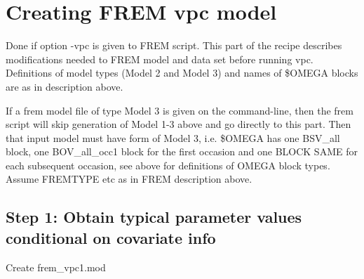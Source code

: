 \documentclass[a4paper,12pt]{article}
\begin{document}
\section{Creating FREM vpc model}
Done if option -vpc is given to FREM script. This part of the recipe describes modifications needed to FREM model and data set before running vpc. Definitions of model types (Model 2 and Model 3) and names of \$OMEGA blocks are as in description above. 

If a frem model file of type Model 3 is given on the command-line, then the frem script will skip generation of Model 1-3 above and go directly to this part. Then that input model must have form of Model 3, i.e. \$OMEGA has one BSV\_all block, one BOV\_all\_occ1 block for the first occasion and one BLOCK SAME for each subsequent occasion, see above for definitions of OMEGA block types.  Assume FREMTYPE etc as in FREM description above.

\subsection{Step 1: Obtain typical parameter values conditional on covariate info}
Create frem\_vpc1.mod
\end{document}
